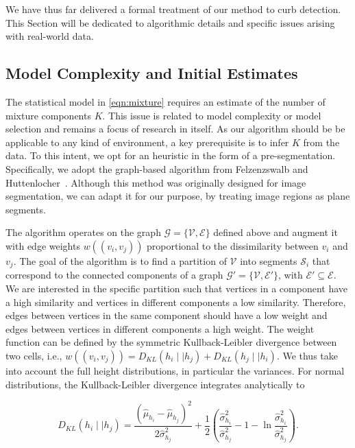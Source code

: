 We have thus far delivered a formal treatment of our method to curb detection.
This Section will be dedicated to algorithmic details and specific issues
arising with real-world data.

\subsection{Model Complexity and Initial Estimates}

The statistical model in \eqref{eqn:mixture} requires an estimate of the number
of mixture components $K$. This issue is related to model complexity or model
selection and remains a focus of research in itself. As our algorithm should be
be applicable to any kind of environment, a key prerequisite is to infer $K$
from the data. To this intent, we opt for an heuristic in the form of a
pre-segmentation. Specifically, we adopt the graph-based algorithm from
Felzenzswalb and Huttenlocher~\cite{felzenszwalb04efficient}. Although this
method was originally designed for image segmentation, we can adapt it for our
purpose, by treating image regions as plane segments.

The algorithm operates on the graph $\mathcal{G}=\{\mathcal{V},\mathcal{E}\}$
defined above and augment it with edge weights $w((v_i,v_j))$ proportional to
the dissimilarity between $v_i$ and $v_j$. The goal of the algorithm is to find
a partition of $\mathcal{V}$ into segments $\mathcal{S}_i$ that correspond to
the connected components of a graph $\mathcal{G}'=\{\mathcal{V},\mathcal{E}'\}$,
with $\mathcal{E}'\subseteq\mathcal{E}$. We are interested in the specific
partition such that vertices in a component have a high similarity and vertices
in different components a low similarity. Therefore, edges between vertices in
the same component should have a low weight and edges between vertices in
different components a high weight. The weight function can be defined by
the symmetric Kullback-Leibler divergence between two cells, i.e.,
$w((v_i,v_j))=D_{KL}(h_i\mid\mid h_j)+D_{KL}(h_j\mid\mid h_i)$. We thus take
into account the full height distributions, in particular the variances. For
normal distributions, the Kullback-Leibler divergence integrates analytically to

\begin{equation}
\label{eqn:kl}
D_{KL}(h_i\mid\mid h_j)=\frac{(\hat{\mu}_{h_i}-\hat{\mu}_{h_j})^2}
{2\hat{\sigma}^2_{h_j}}+\frac{1}{2}(\frac{\hat{\sigma}^2_{h_i}}
{\hat{\sigma}^2_{h_j}}-1-\ln\frac{\hat{\sigma}^2_{h_i}}{\hat{\sigma}^2_{h_j}}).
\end{equation}

